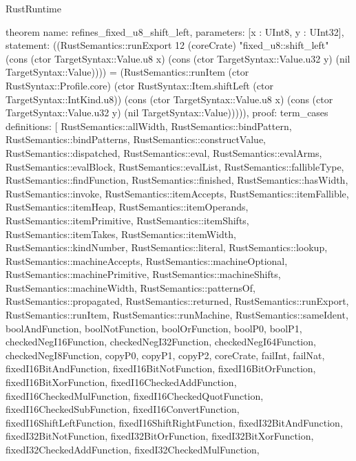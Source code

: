 \begin{lexlean}{RustRuntime}
\begin{semanticmodule}
theorem{
  name: refines_fixed_u8_shift_left,
  parameters: [x : UInt8, y : UInt32],
  statement: ((RustSemantics::runExport 12 (coreCrate) "fixed_u8::shift_left" (cons (ctor TargetSyntax::Value.u8 x) (cons (ctor TargetSyntax::Value.u32 y) (nil TargetSyntax::Value)))) = (RustSemantics::runItem (ctor RustSyntax::Profile.core) (ctor RustSyntax::Item.shiftLeft (ctor TargetSyntax::IntKind.u8)) (cons (ctor TargetSyntax::Value.u8 x) (cons (ctor TargetSyntax::Value.u32 y) (nil TargetSyntax::Value))))),
  proof: term_cases{
    definitions: [
      RustSemantics::allWidth,
      RustSemantics::bindPattern,
      RustSemantics::bindPatterns,
      RustSemantics::constructValue,
      RustSemantics::dispatched,
      RustSemantics::eval,
      RustSemantics::evalArms,
      RustSemantics::evalBlock,
      RustSemantics::evalList,
      RustSemantics::fallibleType,
      RustSemantics::findFunction,
      RustSemantics::finished,
      RustSemantics::hasWidth,
      RustSemantics::invoke,
      RustSemantics::itemAccepts,
      RustSemantics::itemFallible,
      RustSemantics::itemHeap,
      RustSemantics::itemOperands,
      RustSemantics::itemPrimitive,
      RustSemantics::itemShifts,
      RustSemantics::itemTakes,
      RustSemantics::itemWidth,
      RustSemantics::kindNumber,
      RustSemantics::literal,
      RustSemantics::lookup,
      RustSemantics::machineAccepts,
      RustSemantics::machineOptional,
      RustSemantics::machinePrimitive,
      RustSemantics::machineShifts,
      RustSemantics::machineWidth,
      RustSemantics::patternsOf,
      RustSemantics::propagated,
      RustSemantics::returned,
      RustSemantics::runExport,
      RustSemantics::runItem,
      RustSemantics::runMachine,
      RustSemantics::sameIdent,
      boolAndFunction,
      boolNotFunction,
      boolOrFunction,
      boolP0,
      boolP1,
      checkedNegI16Function,
      checkedNegI32Function,
      checkedNegI64Function,
      checkedNegI8Function,
      copyP0,
      copyP1,
      copyP2,
      coreCrate,
      failInt,
      failNat,
      fixedI16BitAndFunction,
      fixedI16BitNotFunction,
      fixedI16BitOrFunction,
      fixedI16BitXorFunction,
      fixedI16CheckedAddFunction,
      fixedI16CheckedMulFunction,
      fixedI16CheckedQuotFunction,
      fixedI16CheckedSubFunction,
      fixedI16ConvertFunction,
      fixedI16ShiftLeftFunction,
      fixedI16ShiftRightFunction,
      fixedI32BitAndFunction,
      fixedI32BitNotFunction,
      fixedI32BitOrFunction,
      fixedI32BitXorFunction,
      fixedI32CheckedAddFunction,
      fixedI32CheckedMulFunction,
}}
\end{semanticmodule}
\end{lexlean}
